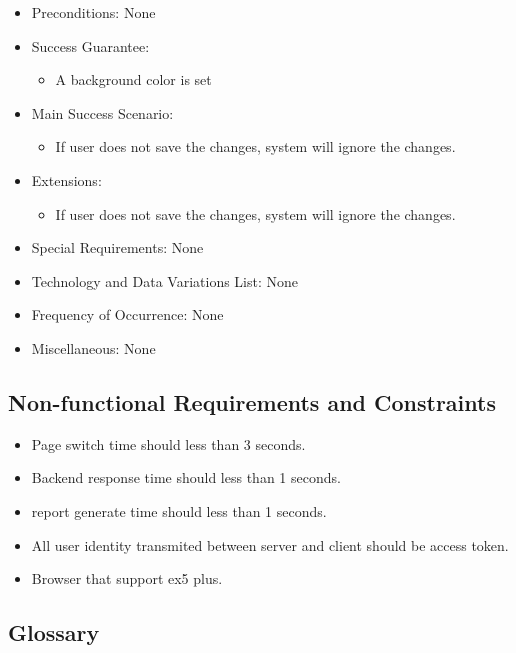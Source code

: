 \documentclass[12pt, a4paper]{article}
\begin{document}
\begin{CJK*}{UTF8}{bkai}
\begin{enumerate}
\begin{itemize}
          \item Preconditions: None
          \item Success Guarantee:
            \begin{itemize}
              \item A background color is set
            \end{itemize}
          \item Main Success Scenario:
            \begin{itemize}
              \item If user does not save the changes, system will ignore the changes.
            \end{itemize}
          \item Extensions:
            \begin{itemize}
              \item If user does not save the changes, system will ignore the changes.
            \end{itemize}
          \item Special Requirements: None
          \item Technology and Data Variations List: None
          \item Frequency of Occurrence: None
          \item Miscellaneous: None
        \end{itemize}
    \end{enumerate}
  \subsection{Non-functional Requirements and Constraints}
    \begin{itemize}
      \item Page switch time should less than 3 seconds.
      \item Backend response time should less than 1 seconds.
      \item report generate time should less than 1 seconds.
      \item All user identity transmited between server and client should be access token.
    \end{itemize}
    \begin{itemize}
      \item Browser that support ex5 plus.
    \end{itemize}
  \subsection{Glossary}


\end{CJK*}
\end{document}
